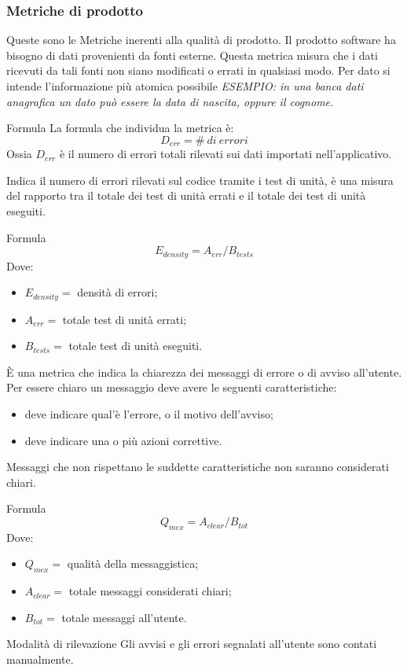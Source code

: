 \subsubsection{Metriche di prodotto}
Queste sono le Metriche inerenti alla qualità di prodotto.
Il prodotto software ha bisogno di dati provenienti da fonti esterne. Questa 
metrica misura che i dati ricevuti da tali fonti non siano modificati o errati 
in qualsiasi modo. Per dato si intende l'informazione più atomica possibile
\textit{ESEMPIO: in una banca dati anagrafica un dato può essere la data di 
nascita, oppure il cognome.}
\par{Formula}
La formula che individua la metrica è:
\begin{displaymath}
  D_{err} = \#\ di\ errori
\end{displaymath}
Ossia $D_{err}$ è il numero di errori totali rilevati sui dati importati 
nell'applicativo.

Indica il numero di errori rilevati sul codice tramite i test di unità, è una 
misura del rapporto tra il totale dei test di unità errati e il totale dei test 
di unità eseguiti.
\par{Formula}
\begin{displaymath}
  E_{density} = A_{err}/B_{tests}
\end{displaymath}
Dove:
\begin{itemize}
  \item[] $E_{density} =$ densità di errori;
  \item[] $A_{err} =$ totale test di unità errati;  
  \item[] $B_{tests} =$ totale test di unità eseguiti.
\end{itemize}

È una metrica che indica la chiarezza dei messaggi di errore o di avviso 
all'utente. Per essere chiaro un messaggio deve avere le seguenti 
caratteristiche:
\begin{itemize}
  \item deve indicare qual'è l'errore, o il motivo dell'avviso;
  \item deve indicare una o più azioni correttive.
\end{itemize}
Messaggi che non rispettano le suddette caratteristiche non saranno considerati 
chiari.
\par{Formula}
\begin{displaymath}
  Q_{mex} = A_{clear}/B_{tot}
\end{displaymath}
Dove:
\begin{itemize}
  \item[] $Q_{mex} =$ qualità della messaggistica;
  \item[] $A_{clear} =$ totale messaggi considerati chiari; 
  \item[] $B_{tot} =$ totale messaggi all'utente.
\end{itemize}
\par{Modalità di rilevazione}
Gli avvisi e gli errori segnalati all'utente sono contati manualmente.

